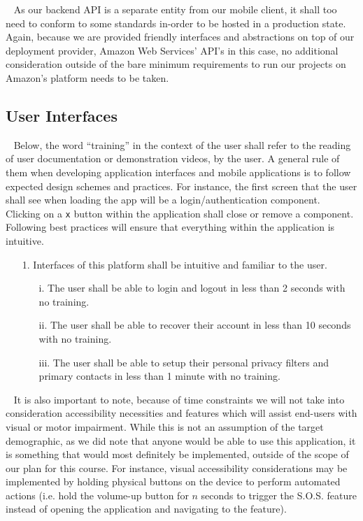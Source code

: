 \documentclass{scrreprt}
\begin{document}
\par ~ As our backend API is a separate entity from our mobile client, it shall too need to conform to some standards in-order to be hosted in a production state. Again, because we are provided friendly interfaces and abstractions on top of our deployment provider, Amazon Web Services' API's in this case, no additional consideration outside of the bare minimum requirements to run our projects on Amazon's platform needs to be taken.


\subsection{User Interfaces}
\par ~ Below, the word ``training'' in the context of the user shall refer to the reading of user documentation or demonstration videos, by the user. A general rule of them when developing application interfaces and mobile applications is to follow expected design schemes and practices. For instance, the first screen that the user shall see when loading the app will be a login/authentication component. Clicking on a \texttt{x} button within the application shall close or remove a component. Following best practices will ensure that everything within the application is intuitive.
\begin{enumerate}
	\item[1.] Interfaces of this platform shall be intuitive and familiar to the user.
	\begin{itemize}
		\item[i.] The user shall be able to login and logout in less than 2 seconds with no training.
		\item[ii.] The user shall be able to recover their account in less than 10 seconds with no training.
		\item[iii.] The user shall be able to setup their personal privacy filters and primary contacts in less than 1 minute with no training.
	\end{itemize}
\end{enumerate}
\par ~ It is also important to note, because of time constraints we will not take into consideration accessibility necessities and features which will assist end-users with visual or motor impairment. While this is not an assumption of the target demographic, as we did note that anyone would be able to use this application, it is something that would most definitely be implemented, outside of the scope of our plan for this course. For instance, visual accessibility considerations may be implemented by holding physical buttons on the device to perform automated actions (i.e. hold the volume-up button for $n$ seconds to trigger the S.O.S. feature instead of opening the application and navigating to the feature).
\end{document}

